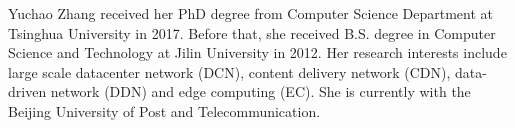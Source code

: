 \documentclass[10pt,journal,compsoc]{IEEEtran}
\begin{document}
%


%
%


%
%
%


%
%
%





%

%
%

%
%
%

%


%
%








%


\newpage

\begin{IEEEbiography}
{Yuchao Zhang} received her PhD degree from Computer Science Department at Tsinghua University in 2017. Before that, she received B.S. degree in Computer Science and Technology at Jilin University in 2012. Her research interests include large scale datacenter network (DCN), content delivery network (CDN), data-driven network (DDN) and edge computing (EC). She is currently with the Beijing University of Post and Telecommunication.
\end{IEEEbiography}
\end{document}

